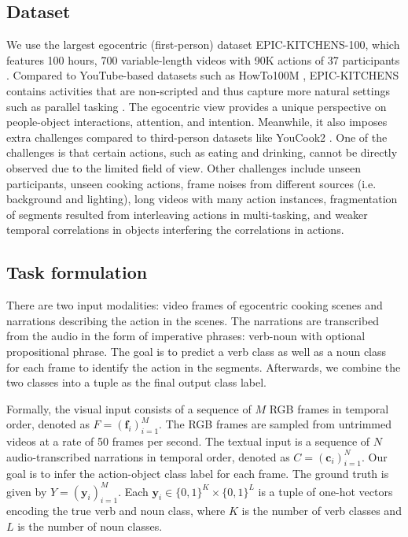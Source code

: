 \documentclass[11pt,a4paper]{article}
\begin{document}
\subsection{Dataset}
We use the largest egocentric (first-person) dataset  EPIC-KITCHENS-100, which features 100 hours, 700 variable-length videos with 90K actions of 37 participants \cite{Damen2020RESCALING}. Compared to YouTube-based datasets such as HowTo100M \cite{miech19howto100m}, EPIC-KITCHENS contains activities that are non-scripted and thus capture more natural settings such as parallel tasking . The egocentric view provides a unique perspective on people-object interactions, attention, and intention. Meanwhile, it also imposes extra challenges compared to third-person datasets like YouCook2 \cite{ZhXuCoAAAI18}. One of the challenges is that certain actions, such as eating and drinking, cannot be directly observed due to the limited field of view. Other challenges include unseen participants, unseen cooking actions, frame noises from different sources (i.e. background and lighting), long videos with many action instances, fragmentation of segments resulted from interleaving actions in multi-tasking, and weaker temporal correlations in objects interfering the correlations in actions.

\subsection{Task formulation}
There are two input modalities: video frames of egocentric cooking scenes and narrations describing the action in the scenes. The narrations are transcribed from the audio in the form of imperative phrases: verb-noun with optional propositional phrase. The goal is to predict a verb class as well as a noun class for each frame to identify the action in the segments. Afterwards, we combine the two classes into a tuple as the final output class label. 

Formally, the visual input consists of a sequence of $M$ RGB frames in temporal order, denoted as $F=(\mathbf{f}_i)_{i=1}^M$. The RGB frames are sampled from untrimmed videos at a rate of 50 frames per second. The textual input is a sequence of $N$ audio-transcribed narrations in temporal order, denoted as $C=(\mathbf{c}_i)_{i=1}^N$. Our goal is to infer the action-object class label for each frame. The ground truth is given by $Y=(\mathbf{y}_i)_{i=1}^M$. Each $\mathbf{y}_i\in\{0,1\}^K\times\{0,1\}^L$ is a tuple of one-hot vectors encoding the true verb and noun class, where $K$ is the number of verb classes and $L$ is the number of noun classes.
\end{document}
